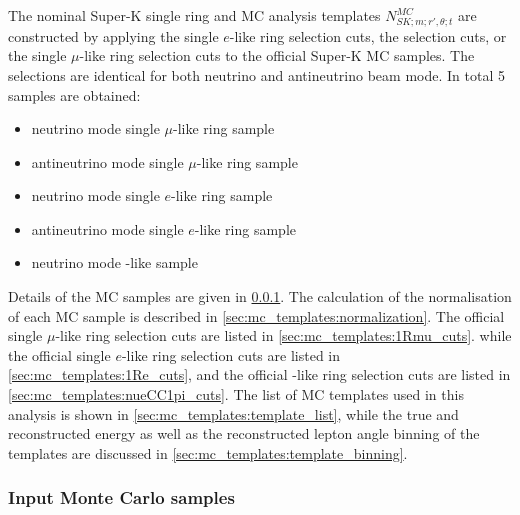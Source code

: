 The nominal Super-K single ring and \nueCConepi{} MC analysis templates $N_{SK;m;r\prime,\theta;t}^{MC}$
 are constructed by applying the single $e$-like ring selection cuts, the \nueCConepi{} selection cuts, 
or the single $\mu$-like ring selection cuts 
to the official Super-K MC samples.
The selections are identical for both neutrino and antineutrino beam mode.
In total 5 samples are obtained:
\begin{itemize}
\item neutrino mode single $\mu$-like ring sample  
\item antineutrino mode single $\mu$-like ring sample  
\item neutrino mode single $e$-like ring sample  
\item antineutrino mode single $e$-like ring sample
\item neutrino mode \nueCConepi{}-like sample    
\end{itemize}
Details of the MC samples are given in \cref{sec:mc_templates:input_mc}.
The calculation of the normalisation of each MC sample is described in \cref{sec:mc_templates:normalization}.
The official single $\mu$-like ring selection cuts are listed in \cref{sec:mc_templates:1Rmu_cuts}.
while the official single $e$-like ring selection cuts are listed in \cref{sec:mc_templates:1Re_cuts}, and the official \nueCConepi{}-like ring selection cuts are listed in \cref{sec:mc_templates:nueCC1pi_cuts}.
The list of MC templates used in this analysis is shown in \cref{sec:mc_templates:template_list},
while the true and reconstructed energy as well as the reconstructed lepton angle binning of the templates are discussed 
in \cref{sec:mc_templates:template_binning}.

\subsubsection {Input Monte Carlo samples}
\label{sec:mc_templates:input_mc}


